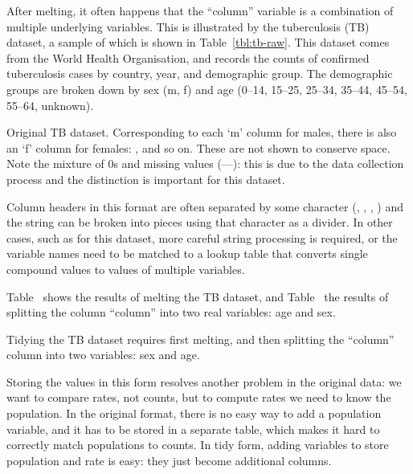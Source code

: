 \documentclass[article]{jss}
\begin{document}
After melting, it often happens that the ``column'' variable is a combination of multiple underlying variables. This is illustrated by the tuberculosis (TB) dataset, a sample of which is shown in Table~\ref{tbl:tb-raw}. This dataset comes from the World Health Organisation, and records the counts of confirmed tuberculosis cases by country, year, and demographic group. The demographic groups are broken down by sex (m, f) and age (0--14, 15--25, 25--34, 35--44, 45--54, 55--64, unknown). 

\begin{table}[htbp]
  \centering
  
  \caption{Original TB dataset. Corresponding to each `m' column for males, there is also an `f' column for females: ,  and so on. These are not shown to conserve space. Note the mixture of 0s and missing values (---): this is due to the data collection process and the distinction is important for this dataset.}
  \label{tbl:tb-raw}
\end{table}

Column headers in this format are often separated by some character (, \code{-}, \code{\_}, \code{:}) and the string can be broken into pieces using that character as a divider. In other cases, such as for this dataset, more careful string processing is required, or the variable names need to be matched to a lookup table that converts single compound values to values of multiple variables. 

Table~ shows the results of melting the TB dataset, and Table~ the results of splitting the column ``column'' into two real variables: age and sex.  

\begin{table}[htbp]
  \centering
  \hspace{2em}%
  
  \caption{Tidying the TB dataset requires first melting, and then splitting the ``column'' column into two variables: sex and age.}
  \label{tbl:tb-clean}
\end{table}

Storing the values in this form resolves another problem in the original data: we want to compare rates, not counts, but to compute rates we need to know the population. In the original format, there is no easy way to add a population variable, and it has to be stored in a separate table, which makes it hard to correctly match populations to counts. In tidy form, adding variables to store population and rate is easy: they just become additional columns.
\end{document}
